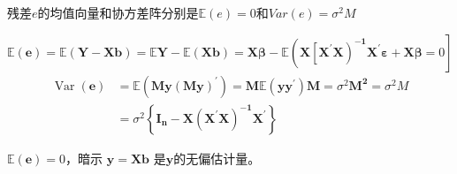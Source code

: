 \begin{mypty}
    残差$ e $的均值向量和协方差阵分别是$ \mathbb{E}(e) = 0 $和$ Var(e) =\sigma^{2}M$
    \begin{myproof}
        $$ \mathbb{E}(\boldsymbol{e})=\mathbb{E}( \boldsymbol{Y-X b})=\mathbb{E} \boldsymbol{Y}-\mathbb{E}(\boldsymbol{X b})
            = \boldsymbol{X \beta}-\mathbb{E}\left(\boldsymbol{X\left[ X^{\prime} X\right)^{-1} X^{\prime} \varepsilon+X \beta} = 0 \right]$$
        $$ \begin{aligned}
            \operatorname{Var}(\boldsymbol{e}) & = \mathbb{E}\boldsymbol{\left(M y(M y)^{\prime}\right)}  
            =\boldsymbol{M} \mathbb{E}\boldsymbol{\left(y y^{\prime}\right) M}
            =\sigma^{2} \boldsymbol{M^{2}}=\sigma^{2} {M} \\
            & = \sigma^{2} \left\{ \boldsymbol{ I_{n}-X \left(X^{\prime} X\right)^{-1} X^{\prime}}\right\}
           \end{aligned} $$

        $ \mathbb{E}(\boldsymbol{e})= 0 $，暗示 $\hat{\boldsymbol{y}} = \boldsymbol{Xb} $ 是$ \boldsymbol{y} $的无偏估计量。
    \end{myproof}
\end{mypty}
